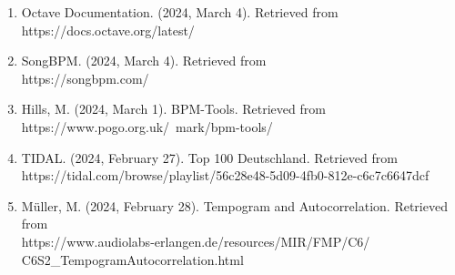 \begin{enumerate}
    \item Octave Documentation. (2024, March 4). Retrieved from \\ https://docs.octave.org/latest/
    \item SongBPM. (2024, March 4). Retrieved from \\ https://songbpm.com/
    \item Hills, M. (2024, March 1). BPM-Tools. Retrieved from \\ https://www.pogo.org.uk/~mark/bpm-tools/
    \item TIDAL. (2024, February 27). Top 100 Deutschland. Retrieved from \\ https://tidal.com/browse/playlist/56c28e48-5d09-4fb0-812e-c6c7c6647dcf
    \item Müller, M. (2024, February 28). Tempogram and Autocorrelation. Retrieved from \\ https://www.audiolabs-erlangen.de/resources/MIR/FMP/C6/ \\ C6S2\_TempogramAutocorrelation.html
\end{enumerate}
